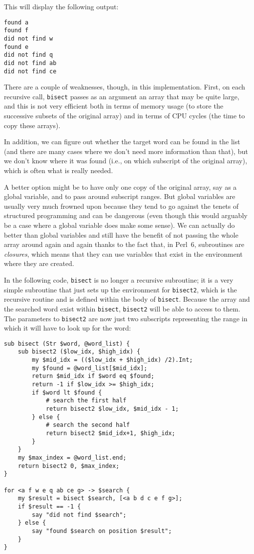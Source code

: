 This will display the following output:
\begin{verbatim}
found a
found f
did not find w
found e
did not find q
did not find ab
did not find ce
\end{verbatim}

There are a couple of weaknesses, though, in this 
implementation. First, on each recursive call, 
{\tt bisect} passes as an argument an array 
that may be quite large, and this is not very 
efficient both in terms of memory usage (to store 
the successive subsets of the original array) and 
in terms of CPU cycles (the time to copy these 
arrays).

In addition, we can figure out whether the target word can 
be found in the list (and there are many cases where 
we don't need more information than that), but we don't 
know where it was found (i.e., on which subscript of 
the original array), which is often what is really 
needed.

A better option might be to have only one copy of the 
original array, say as a global variable, and to pass 
around subscript ranges. But global variables are 
usually very much frowned upon because they tend to go 
against the tenets of structured programming and can 
be dangerous (even though this would arguably be a 
case where a global variable does make some sense). 
We can actually do better than global 
variables and still have the benefit of not passing 
the whole array around again and again thanks to the 
fact that, in Perl~6, subroutines are \emph{closures}, 
which means that they can use variables that exist in 
the environment where they are created.

In the following code, {\tt bisect} is no longer a 
recursive subroutine; it is a very simple subroutine 
that just sets up the environment for {\tt bisect2},
which is the recursive routine and is defined within 
the body of {\tt bisect}. Because the array and the 
searched word exist within {\tt bisect}, {\tt bisect2} 
will be able to access to them. The parameters to 
{\tt bisect2} are now just two subscripts representing 
the range in which it will have to look up for the 
word:

\begin{verbatim}
sub bisect (Str $word, @word_list) {
    sub bisect2 ($low_idx, $high_idx) {
        my $mid_idx = (($low_idx + $high_idx) /2).Int;
        my $found = @word_list[$mid_idx];
        return $mid_idx if $word eq $found;
        return -1 if $low_idx >= $high_idx;
        if $word lt $found {
            # search the first half
            return bisect2 $low_idx, $mid_idx - 1;
        } else {
            # search the second half
            return bisect2 $mid_idx+1, $high_idx;
        }
    }
    my $max_index = @word_list.end;
    return bisect2 0, $max_index;
}

for <a f w e q ab ce g> -> $search { 
    my $result = bisect $search, [<a b d c e f g>];
    if $result == -1 {
        say "did not find $search";
    } else {
        say "found $search on position $result";
    }
}
\end{verbatim}


